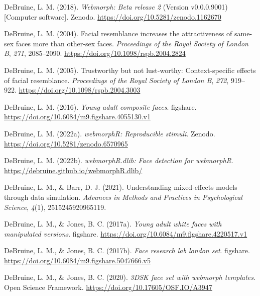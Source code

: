 \documentclass[
  doc,floatsintext]{apa6}
\newlength{\cslhangindent}
\newlength{\cslentryspacingunit} %
\newenvironment{CSLReferences}[2] %
 {%
  \setlength{\parindent}{0pt}
  \ifodd #1
  \let\oldpar\par
  \def\par{\hangindent=\cslhangindent\oldpar}
  \fi
  \setlength{\parskip}{#2\cslentryspacingunit}
 }%
 {}
\begin{document}
\begin{CSLReferences}{1}{0}
\leavevmode{}%
DeBruine, L. M. (2018). \emph{Webmorph: Beta release 2} (Version v0.0.0.9001) {[}Computer software{]}. Zenodo. \url{https://doi.org/10.5281/zenodo.1162670}

\leavevmode{}%
DeBruine, L. M. (2004). Facial resemblance increases the attractiveness of same-sex faces more than other-sex faces. \emph{Proceedings of the Royal Society of London B}, \emph{271}, 2085--2090. \url{https://doi.org/10.1098/rspb.2004.2824}

\leavevmode{}%
DeBruine, L. M. (2005). Trustworthy but not lust-worthy: Context-specific effects of facial resemblance. \emph{Proceedings of the Royal Society of London B}, \emph{272}, 919--922. \url{https://doi.org/10.1098/rspb.2004.3003}

\leavevmode{}%
DeBruine, L. M. (2016). \emph{Young adult composite faces}. figshare. \url{https://doi.org/10.6084/m9.figshare.4055130.v1}

\leavevmode{}%
DeBruine, L. M. (2022a). \emph{{webmorphR}: Reproducible stimuli}. Zenodo. \url{https://doi.org/10.5281/zenodo.6570965}

\leavevmode{}%
DeBruine, L. M. (2022b). \emph{{webmorphR.dlib}: Face detection for webmorphR}. \url{https://debruine.github.io/webmorphR.dlib/}

\leavevmode{}%
DeBruine, L. M., \& Barr, D. J. (2021). Understanding mixed-effects models through data simulation. \emph{Advances in Methods and Practices in Psychological Science}, \emph{4}(1), 2515245920965119.

\leavevmode{}%
DeBruine, L. M., \& Jones, B. C. (2017a). \emph{Young adult white faces with manipulated versions}. figshare. \url{https://doi.org/10.6084/m9.figshare.4220517.v1}

\leavevmode{}%
DeBruine, L. M., \& Jones, B. C. (2017b). \emph{Face research lab london set}. figshare. \url{https://doi.org/10.6084/m9.figshare.5047666.v5}

\leavevmode{}%
DeBruine, L. M., \& Jones, B. C. (2020). \emph{3DSK face set with webmorph templates}. Open Science Framework. \url{https://doi.org/10.17605/OSF.IO/A3947}


\end{CSLReferences}
\end{document}
